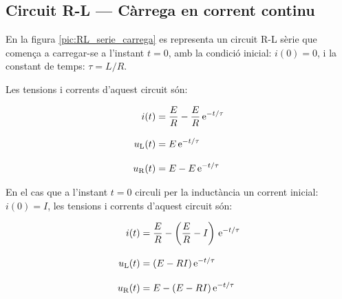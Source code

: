 \subsection{Circuit R-L --- Càrrega en corrent continu}\label{sec:RL-carrega}

En la figura \vref{pic:RL_serie_carrega} es representa un circuit R-L sèrie que comença a carregar-se a l'instant $t=0$, amb la condició inicial: $i(0) = 0$, i la constant de temps: $\tau = L/R$.
\begin{center}
    
    \label{pic:RL_serie_carrega}
\end{center}

Les tensions i corrents d'aquest circuit són:

\hfill
\begin{minipage}[b]{9cm}
    
\end{minipage}
\hfill
\begin{minipage}[b]{6cm}
    \begin{align}
        i(t) &= \frac{E}{R}  - \frac{E}{R} \,\mathrm{e}^{-t/\tau}\label{eq:RL-i-carrega} \\[3mm]
        u_\mathrm{L}(t) &= E\,\mathrm{e}^{-t/\tau}\label{eq:RL-ul-carrega} \\[3mm]
        u_\mathrm{R}(t) &= E - E\,\mathrm{e}^{-t/\tau}
    \end{align}
\end{minipage}

\vspace{5mm}
En el cas que a l'instant $t=0$ circuli per la inductància un corrent inicial: $i(0) = I$, les tensions i corrents d'aquest circuit són:

\hfill
\begin{minipage}[b]{9cm}
    
\end{minipage}
\hfill
\begin{minipage}[b]{6cm}
    \begin{align}
        i(t) &= \frac{E}{R}  - \left(\frac{E}{R}-I\right) \,\mathrm{e}^{-t/\tau}\label{eq:RL-i-carrega-ini} \\[3mm]
        u_\mathrm{L}(t) &= (E- R I)\,\mathrm{e}^{-t/\tau}\label{eq:RL-ul-carrega-ini} \\[3mm]
        u_\mathrm{R}(t) &= E - (E-R I)\,\mathrm{e}^{-t/\tau}
    \end{align}
\end{minipage}


